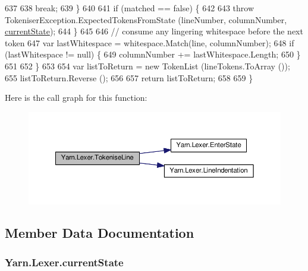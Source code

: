 \begin{DoxyCode}
637 
638                     \textcolor{keywordflow}{break};
639                 \}
640 
641                 \textcolor{keywordflow}{if} (matched == \textcolor{keyword}{false}) \{
642 
643                     \textcolor{keywordflow}{throw} TokeniserException.ExpectedTokensFromState (lineNumber, columnNumber, 
      \hyperlink{a00129_ac90b7dce8103425a148f9e8588f14137}{currentState});
644                 \}
645 
646                 \textcolor{comment}{// consume any lingering whitespace before the next token}
647                 var lastWhitespace = whitespace.Match(line, columnNumber);
648                 \textcolor{keywordflow}{if} (lastWhitespace != null) \{
649                     columnNumber += lastWhitespace.Length;
650                 \}
651 
652             \}
653 
654             var listToReturn = \textcolor{keyword}{new} TokenList (lineTokens.ToArray ());
655             listToReturn.Reverse ();
656 
657             \textcolor{keywordflow}{return} listToReturn;
658 
659         \}
\end{DoxyCode}


Here is the call graph for this function\-:
\nopagebreak
\begin{figure}[H]
\begin{center}
\leavevmode
\includegraphics[width=350pt]{a00129_a20b63f6ef434f6a40fd388f262f03fa8_cgraph}
\end{center}
\end{figure}




\subsection{Member Data Documentation}
\hypertarget{a00129_ac90b7dce8103425a148f9e8588f14137}{
\subsubsection[{current\-State}]{ Yarn.\-Lexer.\-current\-State\hspace{0.3cm}{\ttfamily [private]}}}\label{a00129_ac90b7dce8103425a148f9e8588f14137}


